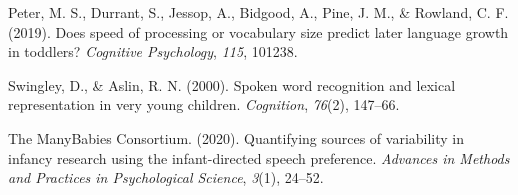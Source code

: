 \documentclass[10pt, letterpaper]{article}
\begin{document}
\leavevmode\hypertarget{ref-peter2019}{}%
Peter, M. S., Durrant, S., Jessop, A., Bidgood, A., Pine, J. M., \&
Rowland, C. F. (2019). Does speed of processing or vocabulary size
predict later language growth in toddlers? \emph{Cognitive Psychology},
\emph{115}, 101238.

\leavevmode\hypertarget{ref-Swingley2000}{}%
Swingley, D., \& Aslin, R. N. (2000). Spoken word recognition and
lexical representation in very young children. \emph{Cognition},
\emph{76}(2), 147--66.

\leavevmode\hypertarget{ref-TheManyBabiesConsortium2020}{}%
The ManyBabies Consortium. (2020). Quantifying sources of variability in
infancy research using the infant-directed speech preference.
\emph{Advances in Methods and Practices in Psychological Science},
\emph{3}(1), 24--52.


\end{document}
